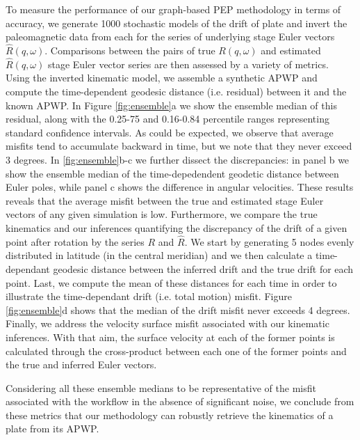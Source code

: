 \documentclass{article} %
\begin{document}
To measure the performance of our graph-based PEP methodology in terms of accuracy, we generate 1000 stochastic models of the drift of plate
and invert the paleomagnetic data from each for the series of underlying stage Euler vectors $\hat R (q,\omega)$. Comparisons between the pairs of true $R (q,\omega)$ and estimated $\hat R (q,\omega)$ stage Euler vector series are then assessed by a variety of metrics. Using the inverted kinematic model, we assemble a synthetic APWP and compute the time-dependent geodesic distance (i.e. residual) between it and the known APWP. In Figure \ref{fig:ensemble}a we show the ensemble median of this residual, along with the 0.25-75 and 0.16-0.84 percentile ranges representing standard confidence intervals. As could be expected, we observe that average misfits tend to accumulate backward in time, but we note that they never exceed 3 degrees. In \ref{fig:ensemble}b-c we further dissect the discrepancies: in panel b we show the ensemble median of the time-depedendent geodetic distance between Euler poles, while panel c shows the difference in angular velocities. These results reveals that the average misfit between the true and estimated stage Euler vectors of any given simulation is low. 
Furthermore, we compare the true kinematics and our inferences quantifying the discrepancy of the drift of a given point after rotation by the series $R$ and $\hat{R}$. We start by generating 5 nodes evenly distributed in latitude (in the central meridian) and we then calculate a time-dependant geodesic distance between the inferred drift and the true drift for each point. Last, we compute the mean of these distances for each time in order to illustrate the time-dependant drift (i.e. total motion) misfit. Figure \ref{fig:ensemble}d shows that the median of the drift misfit never exceeds 4 degrees. Finally, we address the velocity surface misfit associated with our kinematic inferences. With that aim, the surface velocity at each of the former points is calculated through the cross-product between each one of the former points and the true and inferred Euler vectors.

Considering all these ensemble medians to be representative of the misfit associated with the workflow in the absence of significant noise, we conclude from these metrics that our methodology can robustly retrieve the kinematics of a plate from its APWP.
\end{document}
